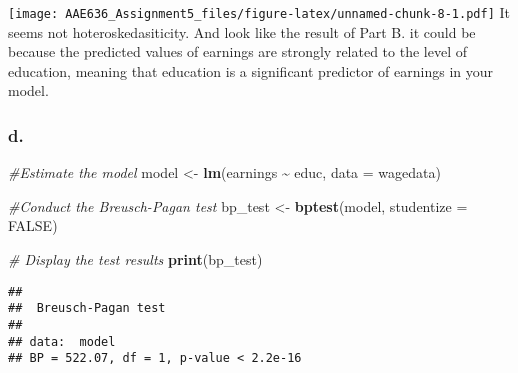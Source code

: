 \documentclass[
]{article}
\newenvironment{Shaded}{\begin{snugshade}}{\end{snugshade}}
\newcommand{\AttributeTok}[1]{\textcolor[rgb]{0.13,0.29,0.53}{#1}}
\newcommand{\CommentTok}[1]{\textcolor[rgb]{0.56,0.35,0.01}{\textit{#1}}}
\newcommand{\ConstantTok}[1]{\textcolor[rgb]{0.56,0.35,0.01}{#1}}
\newcommand{\DecValTok}[1]{\textcolor[rgb]{0.00,0.00,0.81}{#1}}
\newcommand{\FloatTok}[1]{\textcolor[rgb]{0.00,0.00,0.81}{#1}}
\newcommand{\FunctionTok}[1]{\textcolor[rgb]{0.13,0.29,0.53}{\textbf{#1}}}
\newcommand{\NormalTok}[1]{#1}
\newcommand{\OtherTok}[1]{\textcolor[rgb]{0.56,0.35,0.01}{#1}}
\newcommand{\SpecialCharTok}[1]{\textcolor[rgb]{0.81,0.36,0.00}{\textbf{#1}}}
\begin{document}
\texttt{[image: AAE636\_Assignment5\_files/figure-latex/unnamed-chunk-8-1.pdf]}
It seems not hoteroskedasiticity. And look like the result of Part B. it
could be because the predicted values of earnings are strongly related
to the level of education, meaning that education is a significant
predictor of earnings in your model.

\hypertarget{d.}{%
\subsubsection{d.}\label{d.}}

\begin{Shaded}
\begin{Highlighting}[]
\CommentTok{\#Estimate the model}
\NormalTok{model }\OtherTok{\textless{}{-}} \FunctionTok{lm}\NormalTok{(earnings }\SpecialCharTok{\textasciitilde{}}\NormalTok{ educ, }\AttributeTok{data =}\NormalTok{ wagedata)}

\CommentTok{\#Conduct the Breusch{-}Pagan test}
\NormalTok{bp\_test }\OtherTok{\textless{}{-}} \FunctionTok{bptest}\NormalTok{(model, }\AttributeTok{studentize =} \ConstantTok{FALSE}\NormalTok{)}

\CommentTok{\# Display the test results}
\FunctionTok{print}\NormalTok{(bp\_test)}
\end{Highlighting}
\end{Shaded}

\begin{verbatim}
## 
##  Breusch-Pagan test
## 
## data:  model
## BP = 522.07, df = 1, p-value < 2.2e-16
\end{verbatim}

\begin{Shaded}
\end{Shaded}
\end{document}
